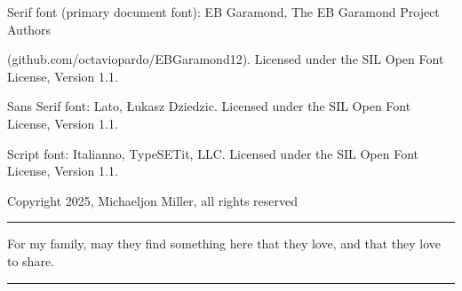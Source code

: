 \NewDocumentCommand \ColophonFonts{}
{
    Serif font (primary document font):
    EB Garamond, \Copyright{} The EB Garamond Project Authors\par
    \quad (github.com/octaviopardo/EBGaramond12). Licensed under the SIL Open Font License, Version 1.1.\par
    Sans Serif font:
    Lato, \Copyright{} Łukasz Dziedzic. Licensed under the SIL Open Font License, Version 1.1.\par
    Script font: Italianno, \Copyright{} TypeSETit, LLC. Licensed under the SIL Open Font License, Version 1.1.\par
}

\NewDocumentCommand \CopyrightInfo{}
{Copyright \Copyright{} 2025, Michaeljon Miller, all rights reserved}

\NewDocumentCommand \MyDedication{}
{\hrule\vspace{5pt} For my family, may they find something here that they love, and that they love to share. \vspace{5pt}\hrule}

\NewDocumentCommand \DedicationVerso{}{}


\graphicspath{{images/}{../images/}} %
\usepackage[skip=2pt, labelformat=empty, font={rm,it}]{caption} %
\captionsetup{justification=centering} %

